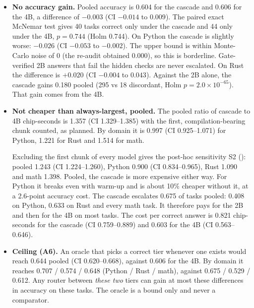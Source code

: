 \documentclass[11pt,a4paper]{article}
\newcommand{\code}[1]{\texttt{\detokenize{#1}}}
\begin{document}
\begin{itemize}
\item \textbf{No accuracy gain.} Pooled accuracy is 0.604 for the cascade and 0.606 for the 4B, a
  difference of $-0.003$ (CI $-0.014$ to $0.009$). The paired exact McNemar test gives 40 tasks
  correct only under the cascade and 44 only under the 4B, $p=0.744$ (Holm 0.744). On Python the
  cascade is slightly worse: $-0.026$ (CI $-0.053$ to $-0.002$). The upper bound is within
  Monte-Carlo noise of 0 (the re-audit obtained 0.000), so this is borderline. Gate-verified 2B answers
  that fail the hidden checks are never escalated. On Rust the difference is $+0.020$ (CI $-0.004$
  to $0.043$). Against the 2B alone, the cascade gains 0.180 pooled (295 vs 18 discordant, Holm
  $p=2.0\times10^{-65}$). That gain comes from the 4B.
\item \textbf{Not cheaper than always-largest, pooled.} The pooled ratio of cascade to 4B
  chip-seconds is 1.357 (CI 1.329--1.385) with the first, compilation-bearing chunk counted, as
  planned. By domain it is 0.997 (CI 0.925--1.071) for Python, 1.221 for Rust and 1.514 for math.

  Excluding the first chunk of every model gives the post-hoc sensitivity S2
  (\code{S2.cost_ratio_cascade_over_large_nowarm.*}): pooled 1.243 (CI 1.224--1.260), Python 0.900
  (CI 0.834--0.965), Rust 1.090 and math 1.398. Pooled, the cascade is more expensive either way. For
  Python it breaks even with warm-up and is about 10\% cheaper without it, at a 2.6-point accuracy
  cost. The cascade escalates 0.675 of tasks pooled: 0.408 on Python, 0.633 on Rust and
  every math task. It therefore pays for the 2B and then for the 4B on most tasks. The cost per
  correct answer is 0.821 chip-seconds for the cascade (CI 0.759--0.889) and 0.603 for the 4B (CI
  0.563--0.646).
\item \textbf{Ceiling (A6).} An oracle that picks a correct tier whenever one exists would reach 0.644 pooled
  (CI 0.620--0.668), against 0.606 for the 4B. By domain it reaches 0.707 / 0.574 / 0.648
  (Python / Rust / math), against 0.675 / 0.529 / 0.612. Any router between \emph{these two} tiers
  can gain at most these differences in accuracy on these tasks. The oracle is a bound only and
  never a comparator.
\end{itemize}
\end{document}
